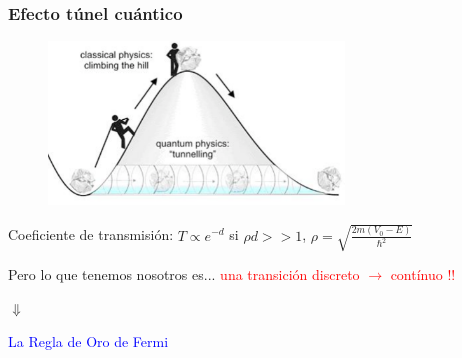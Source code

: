 \begin{frame}
\frametitle{Efecto t\'unel cu\'antico}

\begin{figure}[h!]
\centering
\includegraphics[width=0.7\textwidth]{tunnelling}
\end{figure}

Coeficiente de transmisi\'on: $T \propto e^{-d}$ \hspace{0.5cm} si $\rho d >>1$, $\rho=\sqrt{\frac{2m(V_0-E)}{\hbar^2}}$

\pause
\begin{center}
Pero lo que tenemos nosotros es... \textcolor{red}{una transici\'on discreto $\rightarrow$ cont\'inuo !!}

\vspace{0.3cm}
$\Downarrow$

\vspace{0.3cm}
\textcolor{blue}{La Regla de Oro de Fermi}
\end{center}

\end{frame}

